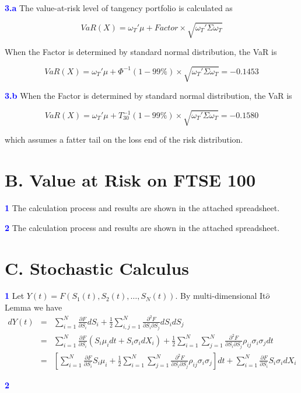 \documentclass[a4paper,11pt] {article}
\begin{document}
\textcolor{blue}{\bf 3.a } The value-at-risk level of tangency portfolio is calculated as

$$
VaR(X) = \omega_T' \mu + Factor \times \sqrt{\omega_T'\Sigma\omega_T}
$$

When the Factor is determined by standard normal distribution, the VaR is

$$
VaR(X) = \omega_T' \mu + \Phi^{-1}(1-99\%) \times \sqrt{\omega_T'\Sigma\omega_T} = -0.1453
$$


\textcolor{blue}{\bf 3.b } When the Factor is determined by standard normal distribution, the VaR is

$$
VaR(X) = \omega_T' \mu + T_30^{-1}(1-99\%) \times \sqrt{\omega_T'\Sigma\omega_T} = -0.1580
$$

which assumes a fatter tail on the loss end of the risk distribution.

\section*{B. Value at Risk on FTSE 100}
\textcolor{blue}{\bf 1 } The calculation process and results are shown in the attached spreadsheet.

\textcolor{blue}{\bf 2 } The calculation process and results are shown in the attached spreadsheet.

\section*{C. Stochastic Calculus}
\textcolor{blue}{\bf 1 } Let $Y(t) = F(S_1(t), S_2(t),\ldots,S_N(t))$. By multi-dimensional It$\hat{o}$ Lemma we have
\begin{eqnarray*}
dY(t) &=& \sum_{i=1}^N \frac{\partial F}{\partial S_i} dS_i + \frac{1}{2}\sum_{i,j=1}^N \frac{\partial^2 F}{\partial S_i \partial S_j} dS_i dS_j \\
      &=& \sum_{i=1}^N \frac{\partial F}{\partial S_i}\left(S_i\mu_i dt + S_i \sigma_i dX_i\right) + \frac{1}{2}\sum_{i=1}^N\sum_{j=1}^N \frac{\partial^2 F}{\partial S_i \partial S_j} \rho_{ij} \sigma_i \sigma_j dt \\
      &=& \left[\sum_{i=1}^N \frac{\partial F}{\partial S_i}S_i\mu_i + \frac{1}{2}\sum_{i=1}^N\sum_{j=1}^N \frac{\partial^2 F}{\partial S_i \partial S_j} \rho_{ij} \sigma_i \sigma_j\right] dt  + \sum_{i=1}^N \frac{\partial F}{\partial S_i}S_i \sigma_i dX_i
\end{eqnarray*}

\textcolor{blue}{\bf 2}
\end{document}
